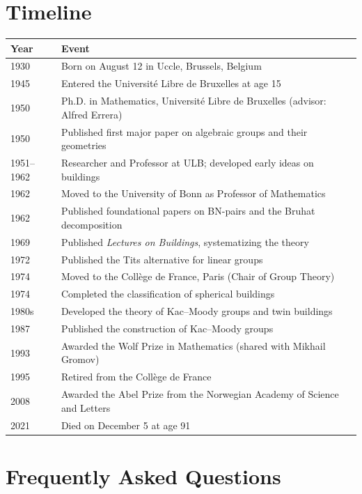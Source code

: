 \section*{Timeline}
\begin{tabularx}{\linewidth}{|p{1.5cm}|>{\raggedright\arraybackslash}X|}
\hline
\textbf{Year} & \textbf{Event} \\ \hline
1930 & Born on August 12 in Uccle, Brussels, Belgium \\ \hline
1945 & Entered the Universit\'e Libre de Bruxelles at age 15 \\ \hline
1950 & Ph.D. in Mathematics, Universit\'e Libre de Bruxelles (advisor: Alfred Errera) \\ \hline
1950 & Published first major paper on algebraic groups and their geometries \\ \hline
1951--1962 & Researcher and Professor at ULB; developed early ideas on buildings \\ \hline
1962 & Moved to the University of Bonn as Professor of Mathematics \\ \hline
1962 & Published foundational papers on BN-pairs and the Bruhat decomposition \\ \hline
1969 & Published \textit{Lectures on Buildings}, systematizing the theory \\ \hline
1972 & Published the Tits alternative for linear groups \\ \hline
1974 & Moved to the Coll\`ege de France, Paris (Chair of Group Theory) \\ \hline
1974 & Completed the classification of spherical buildings \\ \hline
1980s & Developed the theory of Kac--Moody groups and twin buildings \\ \hline
1987 & Published the construction of Kac--Moody groups \\ \hline
1993 & Awarded the Wolf Prize in Mathematics (shared with Mikhail Gromov) \\ \hline
1995 & Retired from the Coll\`ege de France \\ \hline
2008 & Awarded the Abel Prize from the Norwegian Academy of Science and Letters \\ \hline
2021 & Died on December 5 at age 91 \\ \hline
\end{tabularx}

\section{Frequently Asked Questions}


